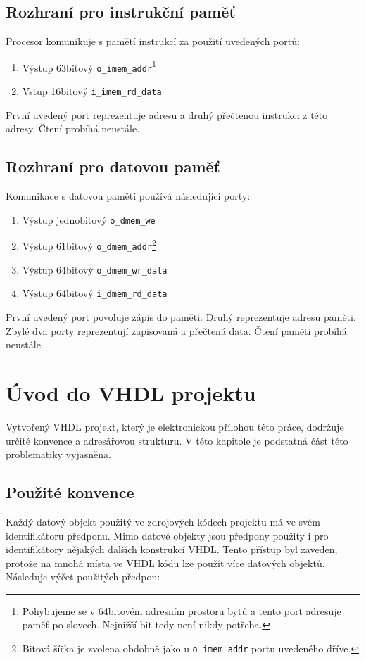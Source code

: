 \documentclass[
  digital, %
  color,   %
  table,   %
  twoside, %
  nolof,   %
  nolot,   %
]{fithesis3}
\begin{document}
\subsection{Rozhraní pro instrukční paměť}
Procesor komunikuje s pamětí instrukcí za použití uvedených portů:

\begin{enumerate}
  \item Výstup 63bitový \texttt{o\_imem\_addr}\footnote{Pohybujeme se v 64bitovém adresním prostoru bytů a tento port adresuje paměť po slovech. Nejnižší bit tedy není nikdy potřeba.}
  \item Vstup 16bitový \texttt{i\_imem\_rd\_data}
\end{enumerate}

První uvedený port reprezentuje adresu a druhý přečtenou instrukci z této adresy. Čtení probíhá neustále.

\subsection{Rozhraní pro datovou paměť}
Komunikace s datovou pamětí používá následující porty:

\begin{enumerate}
  \item Výstup jednobitový \texttt{o\_dmem\_we}
  \item Výstup 61bitový \texttt{o\_dmem\_addr}\footnote{Bitová šířka je zvolena obdobně jako u \texttt{o\_imem\_addr} portu uvedeného dříve.}
  \item Výstup 64bitový \texttt{o\_dmem\_wr\_data}
  \item Výstup 64bitový \texttt{i\_dmem\_rd\_data}
\end{enumerate}

První uvedený port povoluje zápis do paměti. Druhý reprezentuje adresu paměti. Zbylé dva porty reprezentují zapisovaná a přečtená data. Čtení paměti probíhá neustále.

\section{Úvod do VHDL projektu}
\label{sec:project}
Vytvořený VHDL projekt, který je elektronickou přílohou této práce, dodržuje určité konvence a adresářovou strukturu. V této kapitole je podstatná část této problematiky vyjasněna.

\subsection{Použité konvence}
Každý datový objekt použitý ve zdrojových kódech projektu má ve svém identifikátoru předponu. Mimo datové objekty jsou předpony použity i pro identifikátory nějakých dalších konstrukcí VHDL. Tento přístup byl zaveden, protože na mnohá místa ve VHDL kódu lze použít více datových objektů. Následuje výčet použitých předpon:
\end{document}
